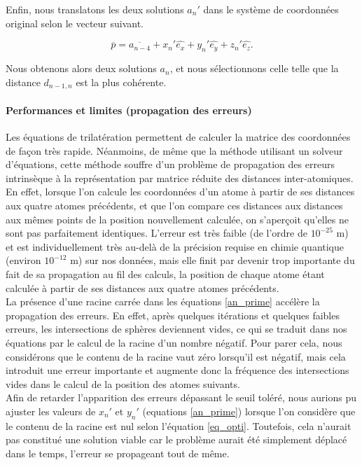 \vspace{0.4cm}

\par Enfin, nous translatons les deux solutions $a_n'$ dans le système de coordonnées original selon le vecteur suivant.

\[
\overline{p} = \overline{a_{n-4}} + x_{n}'\hat{e_x} + y_{n}'\hat{e_y} + z_{n}'\hat{e_z}.
\]

\vspace{0.4cm}

Nous obtenons alors deux solutions $a_n$, et nous sélectionnons celle telle que la distance $d_{n-1,n}$ est la plus cohérente.


\paragraph{Performances et limites (propagation des erreurs)}
\par Les équations de trilatération permettent de calculer la matrice des coordonnées de façon très rapide. Néanmoins, de même que la méthode utilisant un solveur d'équations, cette méthode souffre d'un problème de propagation des erreurs intrinsèque à la représentation par matrice réduite des distances inter-atomiques. En effet, lorsque l'on calcule les coordonnées d'un atome à partir de ses distances aux quatre atomes précédents, et que l'on compare ces distances aux distances aux mêmes points de la position nouvellement calculée, on s'aperçoit qu'elles ne sont pas parfaitement identiques. L'erreur est très faible (de l'ordre de $10^{-25}$ m) et est individuellement très au-delà de la précision requise en chimie quantique (environ $10^{-12}$ m) sur nos données, mais elle finit par devenir trop importante du fait de sa propagation au fil des calculs, la position de chaque atome étant calculée à partir de ses distances aux quatre atomes précédents.\\
La présence d'une racine carrée dans les équations \eqref{an_prime} accélère la propagation des erreurs. En effet, après quelques itérations et quelques faibles erreurs, les intersections de sphères deviennent vides, ce qui se traduit dans nos équations par le calcul de la racine d'un nombre négatif. Pour parer cela, nous considérons que le contenu de la racine vaut zéro lorsqu'il est négatif, mais cela introduit une erreur importante et augmente donc la fréquence des intersections vides dans le calcul de la position des atomes suivants.\\
Afin de retarder l'apparition des erreurs dépassant le seuil toléré, nous aurions pu ajuster les valeurs de $x_n'$ et $y_n'$ (equations \ref{an_prime}) lorsque l'on considère que le contenu de la racine est nul selon l'équation \eqref{eq_opti}. Toutefois, cela n'aurait pas constitué une solution viable car le problème aurait été simplement déplacé dans le temps, l'erreur se propageant tout de même.\\


